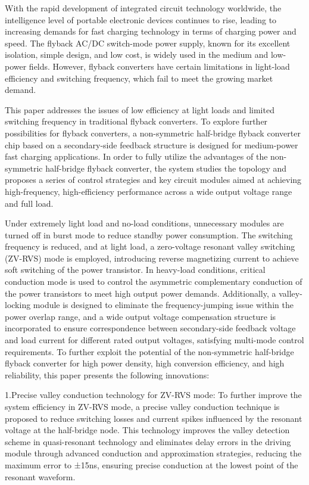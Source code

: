 With the rapid development of integrated circuit technology worldwide, the intelligence level of portable electronic devices continues to rise, leading to increasing demands for fast charging technology in terms of charging power and speed.
The flyback AC/DC switch-mode power supply, known for its excellent isolation, simple design, and low cost, is widely used in the medium and low-power fields. However, flyback converters have certain limitations in light-load efficiency and switching frequency, which fail to meet the growing market demand.

This paper addresses the issues of low efficiency at light loads and limited switching frequency in traditional flyback converters. To explore further possibilities for flyback converters, a non-symmetric half-bridge flyback converter chip based on a secondary-side feedback structure is designed for medium-power fast charging applications.
In order to fully utilize the advantages of the non-symmetric half-bridge flyback converter, the system studies the topology and proposes a series of control strategies and key circuit modules aimed at achieving high-frequency, high-efficiency performance across a wide output voltage range and full load.

Under extremely light load and no-load conditions, unnecessary modules are turned off in burst mode to reduce standby power consumption. The switching frequency is reduced, and at light load, a zero-voltage resonant valley switching (ZV-RVS) mode is employed, introducing reverse magnetizing current to achieve soft switching of the power transistor.
In heavy-load conditions, critical conduction mode is used to control the asymmetric complementary conduction of the power transistors to meet high output power demands. Additionally, a valley-locking module is designed to eliminate the frequency-jumping issue within the power overlap range, and a wide output voltage compensation structure is incorporated to ensure correspondence between secondary-side feedback voltage and load current for different rated output voltages, satisfying multi-mode control requirements.
To further exploit the potential of the non-symmetric half-bridge flyback converter for high power density, high conversion efficiency, and high reliability, this paper presents the following innovations:

1.Precise valley conduction technology for ZV-RVS mode: To further improve the system efficiency in ZV-RVS mode, a precise valley conduction technique is proposed to reduce switching losses and current spikes influenced by the resonant voltage at the half-bridge node. This technology improves the valley detection scheme in quasi-resonant technology and eliminates delay errors in the driving module through advanced conduction and approximation strategies, reducing the maximum error to ±15ns, ensuring precise conduction at the lowest point of the resonant waveform.

